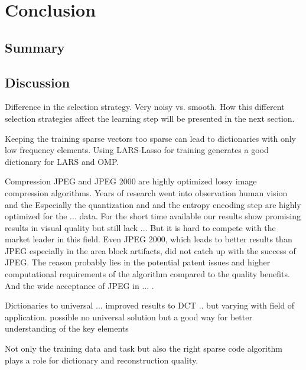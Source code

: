 \chapter{Conclusion}

\section{Summary} %

\section{Discussion}

Difference in the selection strategy.
Very noisy vs. smooth. 
How this different selection strategies affect the learning step will be
presented in the next section.


Keeping the training sparse vectors too sparse can lead to dictionaries with
only low frequency elements. Using LARS-Lasso for training generates a good
dictionary for LARS and OMP. 


Compression 
JPEG and JPEG 2000 are highly optimized lossy image compression algorithms. 
Years of research went into observation human vision and the 
Especially the quantization and and the entropy encoding step are highly
optimized for the ... data.
For the short time available our results show promising results in visual
quality but still lack ...
But it is hard to compete with the market leader in this field.  Even JPEG 2000,
which leads to better results than JPEG especially in the area block artifacts,
did not catch up with the success of JPEG. 
The reason probably lies in the potential patent issues and higher computational
requirements of the algorithm compared
to the quality benefits. And the wide acceptance of JPEG in ...
.


Dictionaries to universal ... improved results to DCT .. but varying with field
of
application. possible no universal solution but a good way for better
understanding of the key elements 

Not only the training data and task but also the right
sparse code algorithm plays a role for dictionary and reconstruction quality.

